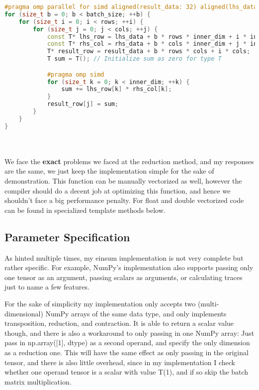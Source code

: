\documentclass[sigconf]{acmart}
\renewcommand{\texttt}[1]{\begingroup\ttfamily\sloppy\hbadness=10000 #1\endgroup}
\begin{document}
\begin{lstlisting}[language=C++]
#pragma omp parallel for simd aligned(result_data: 32) aligned(lhs_data: 32) aligned(rhs_data: 32) collapse(3)
for (size_t b = 0; b < batch_size; ++b) {
    for (size_t i = 0; i < rows; ++i) {
        for (size_t j = 0; j < cols; ++j) {
            const T* lhs_row = lhs_data + b * rows * inner_dim + i * inner_dim;
            const T* rhs_col = rhs_data + b * cols * inner_dim + j * inner_dim;
            T* result_row = result_data + b * rows * cols + i * cols;
            T sum = T(); // Initialize sum as zero for type T

            #pragma omp simd
            for (size_t k = 0; k < inner_dim; ++k) {
                sum += lhs_row[k] * rhs_col[k];
            }
            result_row[j] = sum;
        }
    }
}
\end{lstlisting}
\\\\
We face the \textbf{exact} problems we faced at the reduction method, and my responses are the same, we just keep the implementation simple for the sake of demonstration. This function can be manually vectorized as well, however the compiler should do a decent job at optimizing this function, and hence we shouldn't face a big performance penalty. For \texttt{float} and \texttt{double} vectorized code can be found in specialized template methods below.

\subsection{Parameter Specification}
As hinted multiple times, my einsum implementation is not very complete but rather specific. For example, NumPy's implementation also supports passing only one tensor as an argument, passing scalars as arguments, or calculating traces just to name a few features.

For the sake of simplicity my implementation only accepts two (multi-dimensional) NumPy arrays of the same data type, and only implements transposition, reduction, and contraction. It is able to return a scalar value though, and there is also a workaround to only passing in one NumPy array: Just pass in \texttt{np.array([1], dtype)} as a second operand, and specify the only dimension as a reduction one. This will have the same effect as only passing in the original tensor, and there is also little overhead, since in my implementation I check whether one operand tensor is a scalar with value \texttt{T(1)}, and if so skip the batch matrix multiplication.
\end{document}

